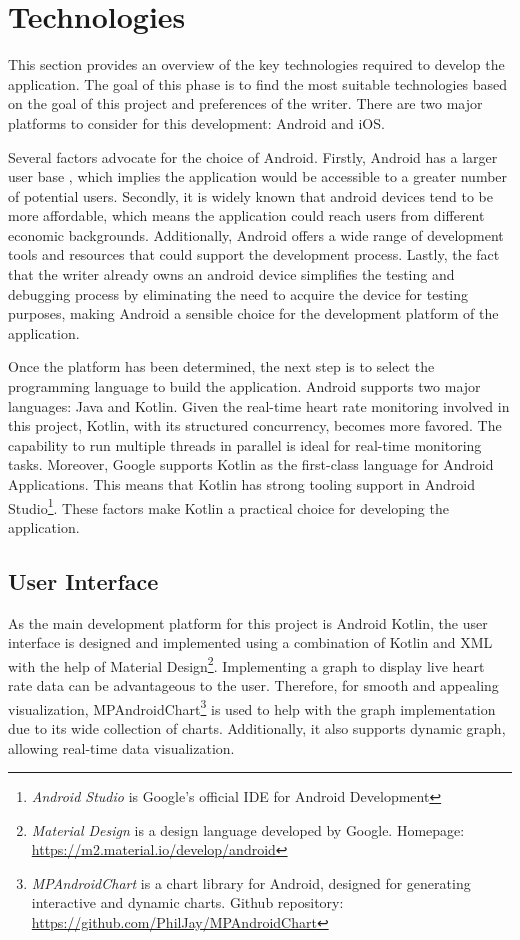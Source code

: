 \section{Technologies}
\label{chap:tech}
This section provides an overview of the key technologies required to develop the application. 
The goal of this phase is to find the most suitable technologies based on the goal of this project and preferences of the writer. 
There are two major platforms to consider for this development: Android and iOS.

Several factors advocate for the choice of Android. 
Firstly, Android has a larger user base \autocite{statcounter_os_market_share}, which implies the application would be accessible to a greater number of potential users. 
Secondly, it is widely known that android devices tend to be more affordable, which means the application could reach users from different economic backgrounds.
Additionally, Android offers a wide range of development tools and resources that could support the development process.
Lastly, the fact that the writer already owns an android device simplifies the testing and debugging process by eliminating the need to acquire the device for testing purposes, making Android a sensible choice for the development platform of the application.

Once the platform has been determined, the next step is to select the programming language to build the application.
Android supports two major languages: Java and Kotlin. Given the real-time heart rate monitoring involved in this project, Kotlin, with its structured concurrency, becomes more favored. The capability to run multiple threads in parallel is ideal for real-time monitoring tasks.
Moreover, Google supports Kotlin as the first-class language for Android Applications. This means that Kotlin has strong tooling support in Android Studio\footnote{\emph{Android Studio} is Google's official IDE for Android Development}. \autocite{kotlin_android}
These factors make Kotlin a practical choice for developing the application.

\subsection{User Interface}
As the main development platform for this project is Android Kotlin, the user interface is designed and implemented using a combination of Kotlin and XML with the help of Material Design\footnote{\emph{Material Design} is a design language developed by Google. Homepage: \url{https://m2.material.io/develop/android}}.
Implementing a graph to display live heart rate data can be advantageous to the user. Therefore, for smooth and appealing visualization, MPAndroidChart\footnote{\emph{MPAndroidChart} is a chart library for Android, designed for generating interactive and dynamic charts. Github repository: \url{https://github.com/PhilJay/MPAndroidChart}} is used to help with the graph implementation due to its wide collection of charts. Additionally, it also supports dynamic graph, allowing real-time data visualization.
